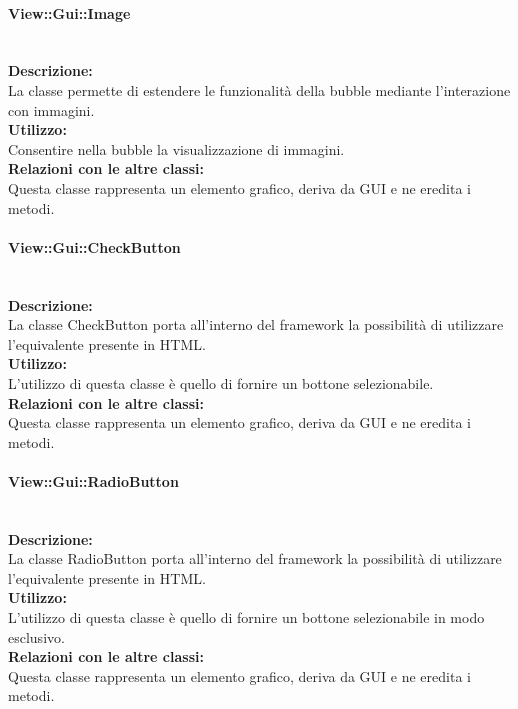 \paragraph{View\-::Gui\-::Image}\label{gui-image}\mbox{}\\
\textbf{Descrizione:}\\
La classe permette di estendere le funzionalità della bubble mediante l'interazione con immagini.\\
\textbf{Utilizzo:}\\
Consentire nella bubble la visualizzazione di immagini.\\
\textbf{Relazioni con le altre classi:}\\
Questa classe rappresenta un elemento grafico, deriva da GUI e ne eredita i metodi.\\

\paragraph{View\-::Gui\-::Check\-Button}\label{gui-check}\mbox{}\\
\textbf{Descrizione:}\\
La classe CheckButton porta all'interno del framework la possibilità di utilizzare l'equivalente presente in HTML.\\
\textbf{Utilizzo:}\\
L'utilizzo di questa classe è quello di fornire un bottone selezionabile.\\
\textbf{Relazioni con le altre classi:}\\
Questa classe rappresenta un elemento grafico, deriva da GUI e ne eredita i metodi.\\

\paragraph{View\-::Gui\-::Radio\-Button}\label{gui-radio}\mbox{}\\
\textbf{Descrizione:}\\
La classe RadioButton porta all'interno del framework la possibilità di utilizzare l'equivalente presente in HTML.\\
\textbf{Utilizzo:}\\
L'utilizzo di questa classe è quello di fornire un bottone selezionabile in modo esclusivo.\\
\textbf{Relazioni con le altre classi:}\\
Questa classe rappresenta un elemento grafico, deriva da GUI e ne eredita i metodi.\\

